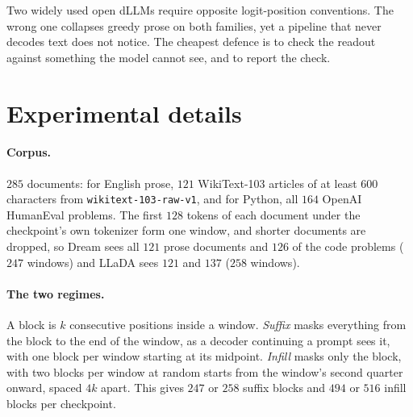 \documentclass{article}
\begin{document}
Two widely used open dLLMs require opposite logit-position conventions. The wrong one
collapses greedy prose on both families, yet a pipeline that never decodes text does not
notice. The cheapest defence is to check the readout against something the model cannot
see, and to report the check.

\clearpage


\clearpage
\appendix
\renewcommand{\topfraction}{0.9}\renewcommand{\bottomfraction}{0.8}
\renewcommand{\textfraction}{0.08}\renewcommand{\floatpagefraction}{0.85}
\setcounter{topnumber}{3}\setcounter{bottomnumber}{2}\setcounter{totalnumber}{4}
\makeatletter
\renewenvironment{table}[1][]{\@float{table}[!htb]}{\end@float}
\newcommand{\tablestack}[2]{%
  \@float{table}[!htb]%
  \begingroup\renewenvironment{table}[1][]{\def\@captype{table}}{\par}%
  \vspace{16pt}\endgroup
  \end@float}
\makeatother
\section{Experimental details}
\label{app:details}

\paragraph{Corpus.} $285$ documents: for English prose, $121$ WikiText-103 articles of at
least $600$ characters from \texttt{wikitext-103-raw-v1}, and for Python, all $164$ OpenAI
HumanEval problems. The first $128$ tokens of each document under the
checkpoint's own tokenizer form one window, and shorter documents are dropped, so Dream
sees all $121$ prose documents and $126$ of the code problems ($247$ windows) and LLaDA
sees $121$ and $137$ ($258$ windows).

\paragraph{The two regimes.} A block is $k$ consecutive positions inside a window.
\emph{Suffix} masks everything from the block to the end of the window, as a decoder
continuing a prompt sees it, with one block per window starting at its midpoint.
\emph{Infill} masks only the block, with two blocks per window at random starts from the
window's second quarter onward, spaced $4k$ apart. This gives $247$ or $258$ suffix
blocks and $494$ or $516$ infill blocks per checkpoint.
\end{document}

